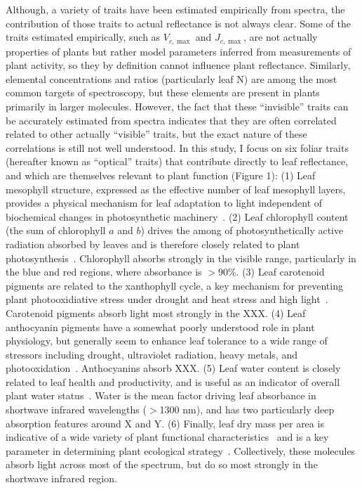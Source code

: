 Although, a variety of traits have been estimated empirically from spectra, the contribution of those traits to actual reflectance is not always clear.
Some of the traits estimated empirically, such as $V_{c,\max}$ and $J_{c,\max}$, are not actually properties of plants but rather model parameters inferred from measurements of plant activity, so they by definition cannot influence plant reflectance.
Similarly, elemental concentrations and ratios (particularly leaf N) are among the most common targets of spectroscopy, but these elements are present in plants primarily in larger molecules.
However, the fact that these ``invisible'' traits can be accurately estimated from spectra indicates that they are often correlated related to other actually ``visible'' traits, but the exact nature of these correlations is still not well understood.
In this study, I focus on six foliar traits (hereafter known as ``optical'' traits) that contribute directly to leaf reflectance, and which are themselves relevant to plant function (Figure 1):
(1) Leaf mesophyll structure, expressed as the effective number of leaf mesophyll layers, provides a physical mechanism for leaf adaptation to light independent of biochemical changes in photosynthetic machinery~\cite{ivanov_2016_photosynthesis,schollert_2017_leaf}.
(2) Leaf chlorophyll content (the sum of chlorophyll $a$ and $b$) drives the among of photosynthetically active radiation absorbed by leaves and is therefore closely related to plant photosynthesis~\cite{croft_2017_chlorophyll}.
Chlorophyll absorbs strongly in the visible range, particularly in the blue and red regions, where absorbance is $>$90\%.
(3) Leaf carotenoid pigments are related to the xanthophyll cycle, a key mechanism for preventing plant photooxidiative stress under drought and heat stress and high light~\cite{}. %
Carotenoid pigments absorb light most strongly in the XXX. %
(4) Leaf anthocyanin pigments have a somewhat poorly understood role in plant physiology, but generally seem to enhance leaf tolerance to a wide range of stressors including drought, ultraviolet radiation, heavy metals, and photooxidation~\cite{gould_2004_nature}.
Anthocyanins absorb XXX.
(5) Leaf water content is closely related to leaf health and productivity, and is useful as an indicator of overall plant water status~\cite{penuelas_1994_reflectance,kramer_1995_water,cheng_2011_spectroscopic,chavana_bryant_2016_leaf}.
Water is the mean factor driving leaf absorbance in shortwave infrared wavelengths ($>$1300 nm), and has two particularly deep absorption features around X and Y. %
(6) Finally, leaf dry mass per area is indicative of a wide variety of plant functional characteristics~\cite{poorter_2009_causes} and is a key parameter in determining plant ecological strategy~\cite{wright_worldwide_2004,reich_world-wide_2014}. %
Collectively, these molecules absorb light across most of the spectrum, but do so most strongly in the shortwave infrared region.

